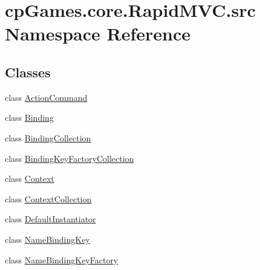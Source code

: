 \hypertarget{namespacecp_games_1_1core_1_1_rapid_m_v_c_1_1src}{}\section{cp\+Games.\+core.\+Rapid\+M\+V\+C.\+src Namespace Reference}
\label{namespacecp_games_1_1core_1_1_rapid_m_v_c_1_1src}
\subsection*{Classes}
\begin{DoxyCompactItemize}
\item 
class \mbox{\hyperlink{classcp_games_1_1core_1_1_rapid_m_v_c_1_1src_1_1_action_command}{Action\+Command}}
\item 
class \mbox{\hyperlink{classcp_games_1_1core_1_1_rapid_m_v_c_1_1src_1_1_binding}{Binding}}
\item 
class \mbox{\hyperlink{classcp_games_1_1core_1_1_rapid_m_v_c_1_1src_1_1_binding_collection}{Binding\+Collection}}
\item 
class \mbox{\hyperlink{classcp_games_1_1core_1_1_rapid_m_v_c_1_1src_1_1_binding_key_factory_collection}{Binding\+Key\+Factory\+Collection}}
\item 
class \mbox{\hyperlink{classcp_games_1_1core_1_1_rapid_m_v_c_1_1src_1_1_context}{Context}}
\item 
class \mbox{\hyperlink{classcp_games_1_1core_1_1_rapid_m_v_c_1_1src_1_1_context_collection}{Context\+Collection}}
\item 
class \mbox{\hyperlink{classcp_games_1_1core_1_1_rapid_m_v_c_1_1src_1_1_default_instantiator}{Default\+Instantiator}}
\item 
class \mbox{\hyperlink{classcp_games_1_1core_1_1_rapid_m_v_c_1_1src_1_1_name_binding_key}{Name\+Binding\+Key}}
\item 
class \mbox{\hyperlink{classcp_games_1_1core_1_1_rapid_m_v_c_1_1src_1_1_name_binding_key_factory}{Name\+Binding\+Key\+Factory}}
\end{DoxyCompactItemize}
